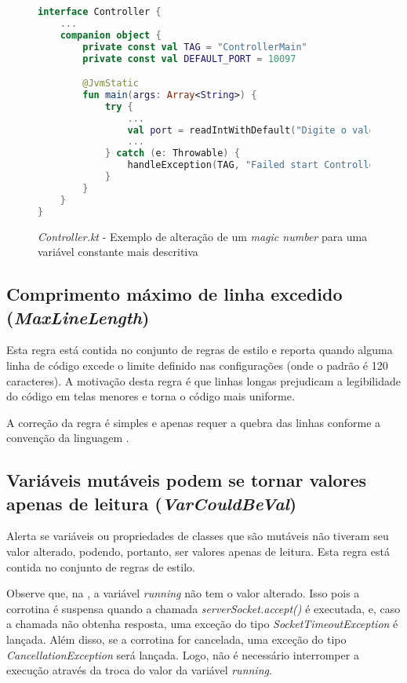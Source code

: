 \begin{figure}[H]
    \centering
    \begin{lstlisting}[language=Kotlin]
interface Controller {
    ...
    companion object {
        private const val TAG = "ControllerMain"
        private const val DEFAULT_PORT = 10097

        @JvmStatic
        fun main(args: Array<String>) {
            try {
                ...
                val port = readIntWithDefault("Digite o valor da porta do servidor", DEFAULT_PORT)
                ...
            } catch (e: Throwable) {
                handleException(TAG, "Failed start Controller...", e)
            }
        }
    }
}
    \end{lstlisting}
    \caption{\textit{Controller.kt} - Exemplo de alteração de um \textit{magic number} para uma variável constante mais descritiva}
    \label{fig:detekt_magic_number_after_example}
\end{figure}

\subsection{Comprimento máximo de linha excedido (\textit{MaxLineLength})}

Esta regra está contida no conjunto de regras de estilo e reporta quando alguma linha de código excede o limite definido nas configurações (onde o padrão é 120 caracteres). A motivação desta regra é que linhas longas prejudicam a legibilidade do código em telas menores e torna o código mais uniforme.

A correção da regra é simples e apenas requer a quebra das linhas conforme a convenção da linguagem \cite{kotlin_code_conventions}.

\subsection{Variáveis mutáveis podem se tornar valores apenas de leitura (\textit{VarCouldBeVal})}

Alerta se variáveis ou propriedades de classes que são mutáveis não tiveram seu valor alterado, podendo, portanto, ser valores apenas de leitura. Esta regra está contida no conjunto de regras de estilo.

Observe que, na , a variável \textit{running} não tem o valor alterado. Isso pois a corrotina é suspensa quando a chamada \textit{serverSocket.accept()} é executada, e, caso a chamada não obtenha resposta, uma exceção do tipo \textit{SocketTimeoutException} é lançada. Além disso, se a corrotina for cancelada, uma exceção do tipo \textit{CancellationException} será lançada. Logo, não é necessário interromper a execução através da troca do valor da variável \textit{running}.

